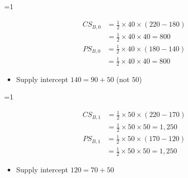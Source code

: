\documentclass{beamer}
\newcommand{\showanswers}{0}
\begin{document}
\ifnum\showanswers=1
\begin{frame}[plain,label=w2_ans_q33a0]
  \Large
  \begin{align*}
    \tag{M44}\;CS_{B,0} &= \tfrac{1}{2} \times 40 \times (220 - 180)\\
                       &= \tfrac{1}{2} \times 40 \times 40 = 800
  \end{align*}
  \begin{align*}
    \tag{M45}\;PS_{B,0} &= \tfrac{1}{2} \times 40 \times (180 - 140)\\
                       &= \tfrac{1}{2} \times 40 \times 40 = 800
  \end{align*}

  \vspace{0.3em}
  \begin{itemize}\Large
    \item Supply intercept $140 = 90 + 50$ (not $50$)
  \end{itemize}
\end{frame}
\fi

\ifnum\showanswers=1
\begin{frame}[plain,label=w2_ans_q33a1]
  \Large
  \begin{align*}
    \tag{M46}\;CS_{B,1} &= \tfrac{1}{2} \times 50 \times (220 - 170)\\
                       &= \tfrac{1}{2} \times 50 \times 50 = 1{,}250
  \end{align*}
  \begin{align*}
    \tag{M47}\;PS_{B,1} &= \tfrac{1}{2} \times 50 \times (170 - 120)\\
                       &= \tfrac{1}{2} \times 50 \times 50 = 1{,}250
  \end{align*}

  \vspace{0.3em}
  \begin{itemize}\Large
    \item Supply intercept $120 = 70 + 50$
  \end{itemize}
\end{frame}
\fi
\end{document}
